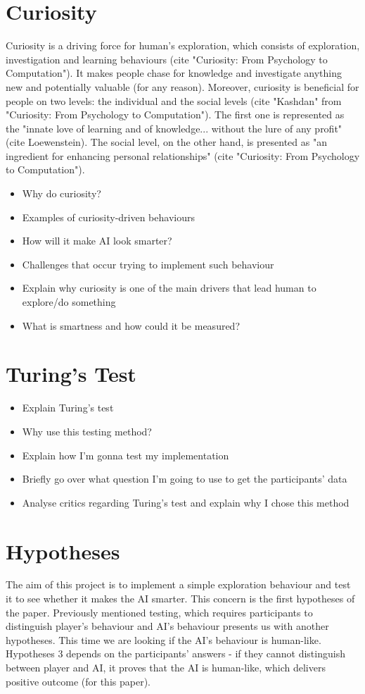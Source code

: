 \documentclass[journal]{IEEEtran}
\begin{document}
\section{Curiosity}
Curiosity is a driving force for human's exploration, which consists of exploration, investigation and learning behaviours (cite "Curiosity: From Psychology to Computation"). It makes people chase for knowledge and investigate anything new and potentially valuable (for any reason). Moreover, curiosity is beneficial for people on two levels: the individual and the social levels (cite "Kashdan" from "Curiosity: From Psychology to Computation"). The first one is represented as the "innate love of learning and of knowledge... without the lure of any profit" (cite Loewenstein). The social level, on the other hand, is presented as "an ingredient for enhancing personal relationships" (cite "Curiosity: From Psychology to Computation").
\begin{itemize}
	\item Why do curiosity?
	\item Examples of curiosity-driven behaviours
	\item How will it make AI look smarter?
	\item Challenges that occur trying to implement such behaviour
	\item Explain why curiosity is one of the main drivers that lead human to explore/do something
	\item What is smartness and how could it be measured?
\end{itemize}

\section{Turing's Test}
\begin{itemize}
	\item Explain Turing's test
	\item Why use this testing method?
	\item Explain how I'm gonna test my implementation
	\item Briefly go over what question I'm going to use to get the participants' data
	\item Analyse critics regarding Turing's test and explain why I chose this method
\end{itemize}

\section{Hypotheses}
The aim of this project is to implement a simple exploration behaviour and test it to see whether it makes the AI smarter. This concern is the first hypotheses of the paper. Previously mentioned testing, which requires participants to distinguish player's behaviour and AI's behaviour presents us with another hypotheses. This time we are looking if the AI's behaviour is human-like. Hypotheses 3 depends on the participants' answers - if they cannot distinguish between player and AI, it proves that the AI is human-like, which delivers positive outcome (for this paper).
\end{document}
